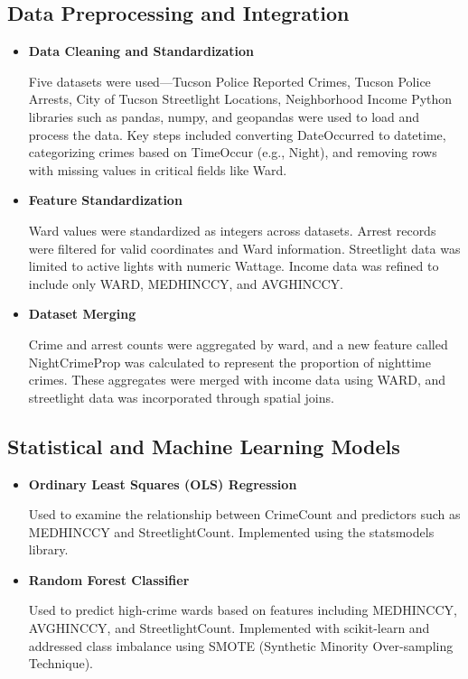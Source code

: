 \documentclass{report}
\begin{document}
	\subsection{Data Preprocessing and Integration}
	
	\begin{itemize}
		\item \textbf{Data Cleaning and Standardization}
		\par Five datasets were used—Tucson Police Reported Crimes, Tucson Police Arrests, City of Tucson Streetlight Locations, Neighborhood Income Python libraries such as pandas, numpy, and geopandas were used to load and process the data. Key steps included converting DateOccurred to datetime, categorizing crimes based on TimeOccur (e.g., Night), and removing rows with missing values in critical fields like Ward.
		
		\item \textbf{Feature Standardization}
		\par Ward values were standardized as integers across datasets. Arrest records were filtered for valid coordinates and Ward information. Streetlight data was limited to active lights with numeric Wattage. Income data was refined to include only WARD, MEDHINC\textunderscore CY, and AVGHINC\textunderscore CY.
		
		\item \textbf{Dataset Merging}
		\par Crime and arrest counts were aggregated by ward, and a new feature called Night\textunderscore Crime\textunderscore Prop was calculated to represent the proportion of nighttime crimes. These aggregates were merged with income data using WARD, and streetlight data was incorporated through spatial joins.
	\end{itemize}
	
	\subsection{Statistical and Machine Learning Models}
	
	\begin{itemize}
		\item \textbf{Ordinary Least Squares (OLS) Regression}
		\par Used to examine the relationship between Crime\textunderscore Count and predictors such as MEDHINC\textunderscore CY and Streetlight\textunderscore Count. Implemented using the statsmodels library.
		
		\item \textbf{Random Forest Classifier}
		\par Used to predict high-crime wards based on features including MEDHINC\textunderscore CY, AVGHINC\textunderscore CY, and Streetlight\textunderscore Count. Implemented with scikit-learn and addressed class imbalance using SMOTE (Synthetic Minority Over-sampling Technique).
	\end{itemize}
	
\end{document}

